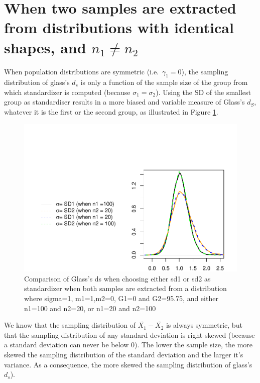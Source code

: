 \documentclass[
  man,floatsintext]{apa6}
\begin{document}
\hypertarget{when-two-samples-are-extracted-from-distributions-with-identical-shapes-and-n_1-neq-n_2}{%
\section{\texorpdfstring{When two samples are extracted from distributions with identical shapes, and \(n_1 \neq n_2\)}{When two samples are extracted from distributions with identical shapes, and n\_1 \textbackslash neq n\_2}}\label{when-two-samples-are-extracted-from-distributions-with-identical-shapes-and-n_1-neq-n_2}}

When population distributions are symmetric (i.e.~\(\gamma_1=0\)), the sampling distribution of glass's \(d_s\) is only a function of the sample size of the group from which standardizer is computed (because \(\sigma_1=\sigma_2\)). Using the SD of the smallest group as standardiser results in a more biased and variable measure of Glass's \(d_S\), whatever it is the first or the second group, as illustrated in Figure \ref{fig:glass3}.

\begin{figure}
\centering
\includegraphics{Mathematical-study-of-Glass-s-d_files/figure-latex/glass3-1.pdf}
\caption{\label{fig:glass3}Comparison of Glass's ds when choosing either sd1 or sd2 as standardizer when both samples are extracted from a distribution where sigma=1, m1=1,m2=0, G1=0 and G2=95.75, and either n1=100 and n2=20, or n1=20 and n2=100}
\end{figure}

We know that the sampling distribution of \(\bar{X_1}-\bar{X_2}\) is always symmetric, but that the sampling distribution of any standard deviation is right-skewed (because a standard deviation can never be below 0). The lower the sample size, the more skewed the sampling distribution of the standard deviation and the larger it's variance. As a consequence, the more skewed the sampling distribution of glass's \(d_s\)).
\end{document}
